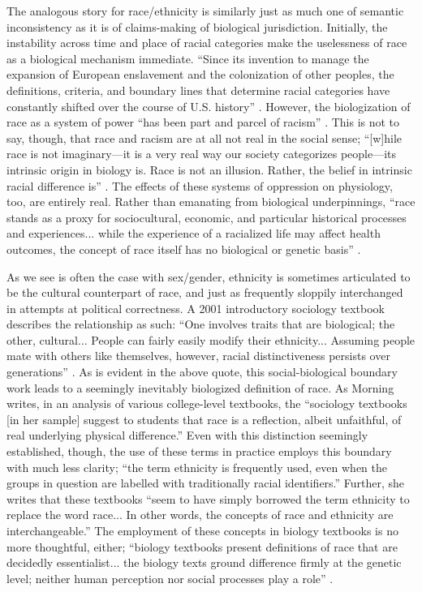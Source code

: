 \hspace{13pt} The analogous story for race/ethnicity is similarly just as much one of semantic inconsistency as it is of claims-making of biological jurisdiction. Initially, the instability across time and place of racial categories make the uselessness of race as a biological mechanism immediate. ``Since its invention to manage the expansion of European enslavement and the colonization of other peoples, the definitions, criteria, and boundary lines that determine racial categories have constantly shifted over the course of U.S. history'' \cite{roberts2011fatal}. However, the biologization of race as a system of power ``has been part and parcel of racism'' \cite{morning2011nature}. This is not to say, though, that race and racism are at all not real in the social sense; ``[w]hile race is not imaginary---it is a very real way our society categorizes people---its intrinsic origin in biology is. Race is not an illusion. Rather, the belief in intrinsic racial difference is'' \cite{roberts2011fatal}. The effects of these systems of oppression on physiology, too, are entirely real. Rather than emanating from biological underpinnings, ``race stands as a proxy for sociocultural, economic, and particular historical processes and experiences... while the
experience of a racialized life may affect health outcomes, the concept of race itself has no biological or genetic basis'' \cite{lee2009race}.

As we see is often the case with sex/gender, ethnicity is sometimes articulated to be the cultural counterpart of race, and just as frequently sloppily interchanged in attempts at political correctness. A 2001 introductory sociology textbook describes the relationship as such:  ``One involves traits that are biological; the other, cultural... People can fairly easily modify their ethnicity... Assuming people mate with others like themselves, however, racial distinctiveness persists over generations'' \cite{macionis2001sociology}. As is evident in the above quote, this social-biological boundary work leads to a seemingly inevitably biologized definition of race. As Morning writes, in an analysis of various college-level textbooks, the ``sociology textbooks [in her sample] suggest to students that race is a reflection, albeit unfaithful, of real underlying physical difference.'' Even with this distinction seemingly established, though, the use of these terms in practice employs this boundary with much less clarity; ``the term ethnicity is frequently used, even when the groups in question are labelled with traditionally racial identifiers.'' Further, she writes that these textbooks ``seem to have simply borrowed the term ethnicity to replace the word race... In other words, the concepts of race and ethnicity are interchangeable.'' The employment of these concepts in biology textbooks is no more thoughtful, either; ``biology textbooks present definitions of race that are decidedly essentialist... the biology texts ground difference firmly at the genetic level; neither human perception nor social processes play a role'' \cite{morning2011nature}.

